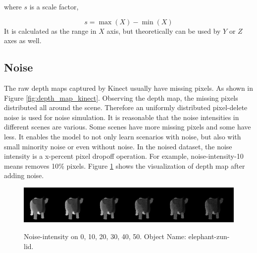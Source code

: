 where $ s $ is a scale factor, 

\begin{dmath*}
	s = \max(X)-\min(X)
\end{dmath*}
It is calculated as the range in $ X $ axis, but theoretically can be used by $ Y $ or $ Z $ axes as well.




\subsection{Noise}
\label{sec:noise}
The raw depth maps captured by Kinect usually have missing pixels. As shown in Figure \ref{fig:depth_map_kinect}.
Observing the depth map, the missing pixels distributed all around the scene. Therefore an uniformly distributed pixel-delete noise is used for noise simulation. 
It is reasonable that the noise intensities in different scenes are various. Some scenes have more missing pixels and some have less. It enables the model to not only learn scenarios with noise, but also with small minority noise or even without noise. In the noised dataset, the noise intensity is a x-percent pixel dropoff operation. For example, noise-intensity-10 means removes 10\% pixels.
Figure \ref{fig:noise-intensity} shows the visualization of depth map after adding noise.
\begin{figure}[!h]
	\centering
	{\includegraphics[width=.9\textwidth]{./Figures/add_noise_depth.png}}
	\decoRule	
	\caption{Noise-intensity on 0, 10, 20, 30, 40, 50. Object Name: elephant-zun-lid.}
	\label{fig:noise-intensity}
\end{figure}


